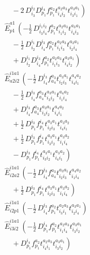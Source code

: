 \documentclass[11pt]{article}
\begin{document}
\begin{align}
&\left.\quad - 2\, D^{i_{2}}_{i_{3}} D^{i_{4}}_{p_{1}} f^{a_{2}}_{p_{1}} t^{a_{2}a_{3}}_{i_{4}i_{2}} t^{a_{3}a_{1}}_{i_{3}i_{1}} \right) \\
&\hat{E}^{a1}_{p1}\,\left(- \tfrac{1}{2}\, D^{i_{1}i_{2}}_{i_{3}i_{4}} f^{a_{2}}_{p_{1}} t^{a_{2}a_{3}}_{i_{1}i_{2}} t^{a_{3}a_{1}}_{i_{4}i_{3}} \right. \\
&\left.\quad - \tfrac{1}{2}\, D^{i_{1}}_{i_{2}} D^{i_{3}}_{i_{4}} f^{a_{2}}_{p_{1}} t^{a_{2}a_{3}}_{i_{1}i_{3}} t^{a_{3}a_{1}}_{i_{2}i_{4}} \right. \\
&\left.\quad + D^{i_{1}}_{i_{2}} D^{i_{3}}_{i_{4}} f^{a_{2}}_{p_{1}} t^{a_{2}a_{3}}_{i_{1}i_{3}} t^{a_{3}a_{1}}_{i_{4}i_{2}} \right) \\
&\hat{E}^{i1a1}_{a2i2}\,\left(- \tfrac{1}{2}\, D^{i_{3}}_{i_{4}} f^{a_{3}}_{a_{4}} t^{a_{3}a_{1}}_{i_{2}i_{3}} t^{a_{4}a_{2}}_{i_{4}i_{1}} \right. \\
&\left.\quad - \tfrac{1}{2}\, D^{i_{3}}_{i_{4}} f^{a_{3}}_{a_{4}} t^{a_{3}a_{1}}_{i_{3}i_{2}} t^{a_{4}a_{2}}_{i_{1}i_{4}} \right. \\
&\left.\quad + D^{i_{3}}_{i_{4}} f^{a_{3}}_{a_{4}} t^{a_{3}a_{1}}_{i_{3}i_{2}} t^{a_{4}a_{2}}_{i_{4}i_{1}} \right. \\
&\left.\quad + \tfrac{1}{2}\, D^{i_{3}}_{p_{1}} f^{i_{4}}_{p_{1}} t^{a_{3}a_{1}}_{i_{2}i_{3}} t^{a_{3}a_{2}}_{i_{4}i_{1}} \right. \\
&\left.\quad + \tfrac{1}{2}\, D^{i_{3}}_{p_{1}} f^{i_{4}}_{p_{1}} t^{a_{3}a_{1}}_{i_{3}i_{2}} t^{a_{3}a_{2}}_{i_{1}i_{4}} \right. \\
&\left.\quad - D^{i_{3}}_{p_{1}} f^{i_{4}}_{p_{1}} t^{a_{3}a_{1}}_{i_{3}i_{2}} t^{a_{3}a_{2}}_{i_{4}i_{1}} \right) \\
&\hat{E}^{i1a1}_{i2a2}\,\left(- \tfrac{1}{2}\, D^{i_{3}}_{i_{4}} f^{a_{3}}_{a_{4}} t^{a_{3}a_{1}}_{i_{2}i_{3}} t^{a_{4}a_{2}}_{i_{1}i_{4}} \right. \\
&\left.\quad + \tfrac{1}{2}\, D^{i_{3}}_{p_{1}} f^{i_{4}}_{p_{1}} t^{a_{3}a_{1}}_{i_{2}i_{3}} t^{a_{3}a_{2}}_{i_{1}i_{4}} \right) \\
&\hat{E}^{i1a1}_{i2p1}\,\left(- \tfrac{1}{2}\, D^{i_{3}}_{i_{4}} f^{a_{2}}_{p_{1}} t^{a_{2}a_{3}}_{i_{3}i_{1}} t^{a_{3}a_{1}}_{i_{2}i_{4}} \right) \\
&\hat{E}^{i1a1}_{i3i2}\,\left(- \tfrac{1}{2}\, D^{i_{4}}_{p_{1}} f^{a_{2}}_{p_{1}} t^{a_{2}a_{3}}_{i_{1}i_{4}} t^{a_{3}a_{1}}_{i_{3}i_{2}} \right. \\
&\left.\quad + D^{i_{4}}_{p_{1}} f^{a_{2}}_{p_{1}} t^{a_{2}a_{3}}_{i_{4}i_{1}} t^{a_{3}a_{1}}_{i_{3}i_{2}} \right) \\

\end{align}
\end{document}
